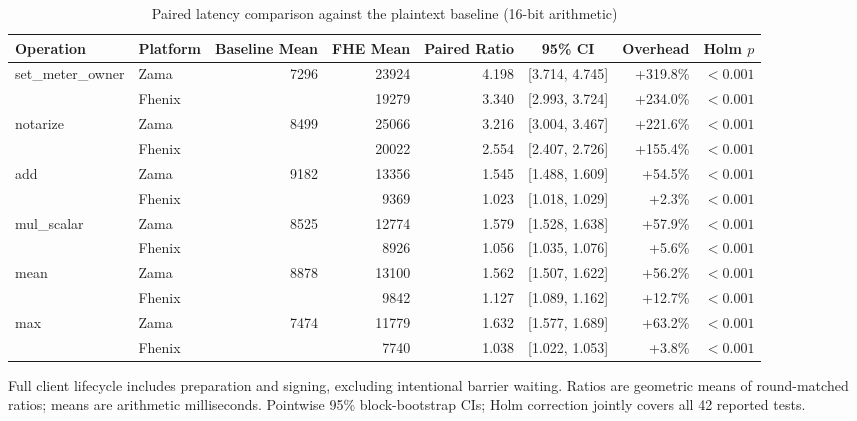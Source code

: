 \begin{table}[!t]
\caption{Paired latency comparison against the plaintext baseline (16-bit arithmetic)}
\label{tab:paired-lifecycle-comparison}
\centering
\footnotesize
\setlength{\tabcolsep}{5pt}
\begin{tabular}{|l|l|r|r|r|c|r|r|}
\hline
\textbf{Operation} & \textbf{Platform} & \textbf{Baseline Mean} & \textbf{FHE Mean} & \textbf{Paired Ratio} & \textbf{95\% CI} & \textbf{Overhead} & \textbf{Holm \(p\)} \\
\hline
\multirow{2}{*}{set\_meter\_owner}
& Zama & \multirow{2}{*}{7296} & 23924 & 4.198 & [3.714, 4.745] & +319.8\% & $<0.001$ \\
& Fhenix &  & 19279 & 3.340 & [2.993, 3.724] & +234.0\% & $<0.001$ \\
\hline
\multirow{2}{*}{notarize}
& Zama & \multirow{2}{*}{8499} & 25066 & 3.216 & [3.004, 3.467] & +221.6\% & $<0.001$ \\
& Fhenix &  & 20022 & 2.554 & [2.407, 2.726] & +155.4\% & $<0.001$ \\
\hline
\multirow{2}{*}{add}
& Zama & \multirow{2}{*}{9182} & 13356 & 1.545 & [1.488, 1.609] & +54.5\% & $<0.001$ \\
& Fhenix &  & 9369 & 1.023 & [1.018, 1.029] & +2.3\% & $<0.001$ \\
\hline
\multirow{2}{*}{mul\_scalar}
& Zama & \multirow{2}{*}{8525} & 12774 & 1.579 & [1.528, 1.638] & +57.9\% & $<0.001$ \\
& Fhenix &  & 8926 & 1.056 & [1.035, 1.076] & +5.6\% & $<0.001$ \\
\hline
\multirow{2}{*}{mean}
& Zama & \multirow{2}{*}{8878} & 13100 & 1.562 & [1.507, 1.622] & +56.2\% & $<0.001$ \\
& Fhenix &  & 9842 & 1.127 & [1.089, 1.162] & +12.7\% & $<0.001$ \\
\hline
\multirow{2}{*}{max}
& Zama & \multirow{2}{*}{7474} & 11779 & 1.632 & [1.577, 1.689] & +63.2\% & $<0.001$ \\
& Fhenix &  & 7740 & 1.038 & [1.022, 1.053] & +3.8\% & $<0.001$ \\
\hline
\hline
\end{tabular}
\vspace{2pt}
\parbox{\textwidth}{\scriptsize Full client lifecycle includes preparation and signing, excluding intentional barrier waiting. Ratios are geometric means of round-matched ratios; means are arithmetic milliseconds. Pointwise 95\% block-bootstrap CIs; Holm correction jointly covers all 42 reported tests.}
\end{table}
